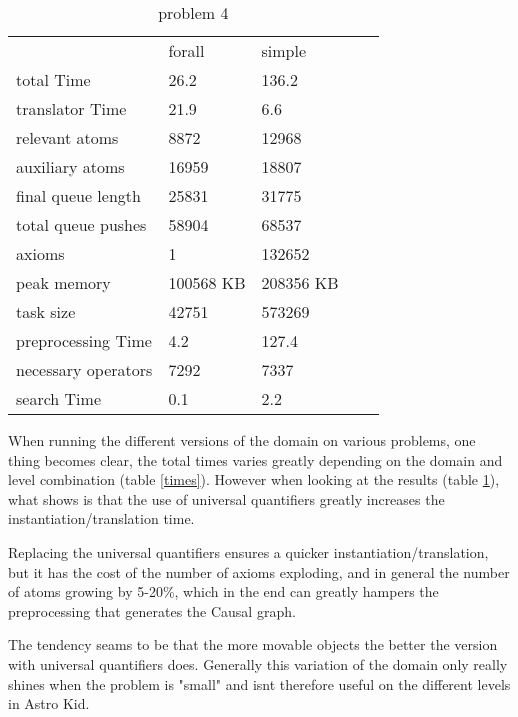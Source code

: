 			\begin{table}[h]
				\centering
				\caption{problem 4}
				\label{prob4}
				\begin{tabular}{lllll}
					& forall & simple  \\
					total Time & 26.2 & 136.2 \\
					translator Time& 21.9 & 6.6 \\
					
					
					relevant atoms & 8872 & 12968\\
					auxiliary atoms & 16959& 18807\\
					final queue length &25831 & 31775\\
					total queue pushes &58904 & 68537\\
					axioms & 1 & 132652 \\ 
					peak memory & 100568 KB & 208356 KB\\ 
					task size & 42751 & 573269\\
					
					
					preprocessing Time& 4.2 & 127.4 \\
					necessary operators & 7292 & 7337\\
					
					
					search Time & 0.1 & 2.2 \\
				\end{tabular}
			\end{table}
			When running the different versions of the domain on various problems, one thing becomes clear, the total times varies greatly depending on the domain and level combination (table \ref{times}). However when looking at the results (table \ref{prob4}), what shows is that the use of universal quantifiers greatly increases the instantiation/translation time. 
			
			Replacing the universal quantifiers ensures a quicker instantiation/translation, but it has the cost of the number of axioms exploding, and in general the number of atoms growing by 5-20\%, which in the end can greatly hampers the preprocessing that generates the Causal graph.
			
			The tendency seams to be that the more movable objects the better the version with universal quantifiers does. Generally this variation of the domain only really shines when the problem is "small" and isnt therefore useful on the different levels in Astro Kid.
			
